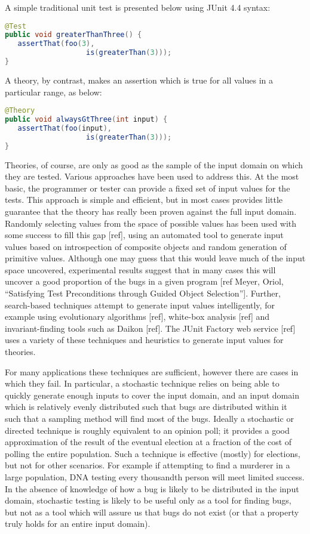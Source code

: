 \documentclass[10pt,journal,cspaper,compsoc]{IEEEtran}
\begin{document}
A simple traditional unit test is presented below using JUnit 4.4 syntax:

\begin{lstlisting}[language=java]
@Test
public void greaterThanThree() {
   assertThat(foo(3),
                   is(greaterThan(3)));
}
\end{lstlisting}

A theory, by contrast, makes an assertion which is true for all values in a particular range, as below:

\begin{lstlisting}[language=java]
@Theory
public void alwaysGtThree(int input) {
   assertThat(foo(input), 
                   is(greaterThan(3)));
}
\end{lstlisting}


Theories, of course, are only as good as the sample of the input domain on which they are tested. Various approaches have been used to address this. At the most basic, the programmer or tester can provide a fixed set of input values for the tests. This approach is simple and efficient, but in most cases provides little guarantee that the theory has really been proven against the full input domain. Randomly selecting values from the space of possible values has been used with some success to fill this gap [ref], using an automated tool to generate input values based on introspection of composite objects and random generation of primitive values. Although one may guess that this would leave much of the input space uncovered, experimental results suggest that in many cases this will uncover a good proportion of the bugs in a given program [ref Meyer, Oriol, “Satisfying Test Preconditions through Guided Object Selection”]. Further, search-based techniques attempt to generate input values intelligently, for example using evolutionary algorithms [ref], white-box analysis [ref] and invariant-finding tools such as Daikon [ref]. The JUnit Factory web service [ref] uses a variety of these techniques and heuristics to generate input values for theories. 

For many applications these techniques are sufficient, however there are cases in which they fail. In particular, a stochastic technique relies on being able to quickly generate enough inputs to cover the input domain, and an input domain which is relatively evenly distributed such that bugs are distributed within it such that a sampling method will find most of the bugs. Ideally a  stochastic or directed technique is roughly equivalent to an opinion poll; it provides a good approximation of the result of the eventual election at a fraction of the cost of polling the entire population. Such a technique is effective (mostly) for elections, but not for other scenarios. For example if attempting to find a murderer in a large population, DNA testing every thousandth person will meet limited success. In the absence of knowledge of how a bug is likely to be distributed in the input domain, stochastic testing is likely to be useful only as a tool for finding bugs, but not as a tool which will assure us that bugs do not exist (or that a property truly holds for an entire input domain).
\end{document}
